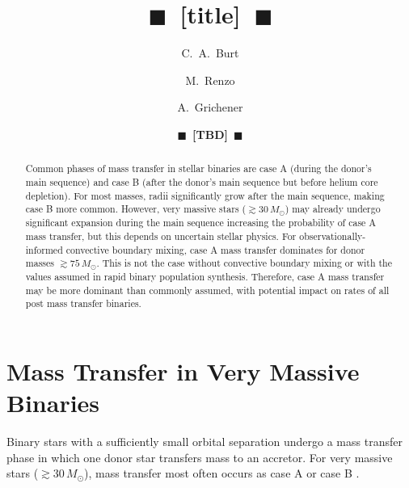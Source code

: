 \documentclass[twocolumn]{aastex63}
\newcommand{\todo}[1]{{\large $\blacksquare$~\textbf{\color{red}[#1]}}~$\blacksquare$}
\begin{document}
\title{\todo{title}}

\author[0009-0008-2061-4946]{C.~A.~Burt}

\author[0000-0002-6718-9472]{M.~Renzo}

\author[0000-0002-2215-1841]{A.~Grichener}

\author{\todo{TBD}}

\begin{abstract}
  Common phases of mass transfer in stellar binaries are case A
  (during the donor's main sequence) and case B (after the donor's
  main sequence but before helium core depletion). For most masses,
  radii significantly grow after the main sequence, making case B more
  common. However, very massive stars ($\gtrsim 30\,M_\odot$) may
  already undergo significant expansion during the main sequence
  increasing the probability of case A mass transfer, but this depends
  on uncertain stellar physics. For observationally-informed
  convective boundary mixing, case A mass transfer dominates for donor
  masses $\gtrsim 75 \, M_{\odot}$.  This is not the case without
  convective boundary mixing or with the values assumed in rapid
  binary population synthesis. Therefore, case A mass transfer may be
  more dominant than commonly assumed, with potential impact on rates
  of all post mass transfer binaries.
\end{abstract}

\section{Mass Transfer in Very Massive Binaries}

Binary stars with a sufficiently small orbital separation undergo a
mass transfer phase in which one donor star transfers mass to an
accretor. For very massive stars ($ \gtrsim 30 \, M_{\odot}$), mass
transfer most often occurs as case A or case B \cite{kippenhahn:67}.
\end{document}
